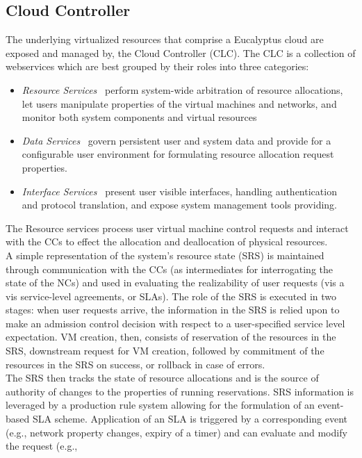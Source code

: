 \subsection{Cloud Controller}
The underlying virtualized resources that comprise a Eucalyptus cloud are exposed and managed by, the Cloud Controller (CLC). The CLC 
is a collection of webservices which are best grouped by their roles into three categories:
\begin{itemize}
  \item \emph{Resource Services} \textendash\ perform system-wide arbitration of resource allocations, let users manipulate properties 
  of the virtual machines and networks, and monitor both system components and virtual resources
  \item \emph{Data Services} \textendash\ govern persistent user and system data and provide for a configurable user environment for 
  formulating resource allocation request properties.
  \item \emph{Interface Services} \textendash\ present user visible interfaces, handling authentication and protocol translation, 
  and expose system management tools providing.
\end{itemize}
The Resource services process user virtual machine control requests and interact with the CCs to effect the allocation and deallocation 
of physical resources.\\
A simple representation of the system’s resource state (SRS) is maintained through communication with the CCs 
(as intermediates for interrogating the state of the NCs) and used in evaluating the realizability of user requests (vis a vis 
service-level agreements, or SLAs). The role of the SRS is executed in two stages: when user requests arrive, the information in the SRS 
is relied upon to make an admission control decision with respect to a user-specified service level expectation. VM creation, then, 
consists of reservation of the resources in the SRS, downstream request for VM creation, followed by commitment of the resources in the 
SRS on success, or rollback in case of errors.\\
The SRS then tracks the state of resource allocations and is the source of authority of changes to the properties of running reservations. 
SRS information is leveraged by a production rule system allowing for the formulation of an event-based SLA scheme. Application of an SLA is 
triggered by a corresponding event (e.g., network property changes, expiry of a timer) and can evaluate and modify the request (e.g., 
